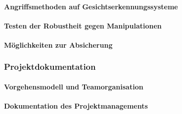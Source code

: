 \paragraph{Angriffsmethoden auf Gesichtserkennungssysteme}
\paragraph{Testen der Robustheit gegen Manipulationen}
\paragraph{Möglichkeiten zur Absicherung}

\subsubsection{Projektdokumentation}
\paragraph{Vorgehensmodell und Teamorganisation}
\paragraph{Dokumentation des Projektmanagements}